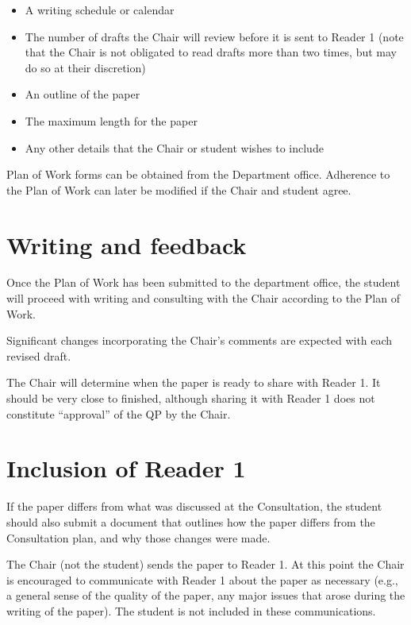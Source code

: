 \documentclass[
]{book}
\providecommand{\tightlist}{%
  \setlength{\itemsep}{0pt}\setlength{\parskip}{0pt}}
\begin{document}
\begin{itemize}
\tightlist
\item
  A writing schedule or calendar
\item
  The number of drafts the Chair will review before it is sent to Reader 1 (note that the Chair is not obligated to read drafts more than two times, but may do so at their discretion)
\item
  An outline of the paper
\item
  The maximum length for the paper
\item
  Any other details that the Chair or student wishes to include
\end{itemize}

Plan of Work forms can be obtained from the Department office. Adherence to the Plan of Work can later be modified if the Chair and student agree.

\hypertarget{feedback}{%
\section{Writing and feedback}\label{feedback}}

Once the Plan of Work has been submitted to the department office, the student will proceed with writing and consulting with the Chair according to the Plan of Work.

Significant changes incorporating the Chair's comments are expected with each revised draft.

The Chair will determine when the paper is ready to share with Reader 1. It should be very close to finished, although sharing it with Reader 1 does not constitute ``approval'' of the QP by the Chair.

\hypertarget{reader1}{%
\section{Inclusion of Reader 1}\label{reader1}}

If the paper differs from what was discussed at the Consultation, the student should also submit a document that outlines how the paper differs from the Consultation plan, and why those changes were made.

The Chair (not the student) sends the paper to Reader 1. At this point the Chair is encouraged to communicate with Reader 1 about the paper as necessary (e.g., a general sense of the quality of the paper, any major issues that arose during the writing of the paper). The student is not included in these communications.
\end{document}
